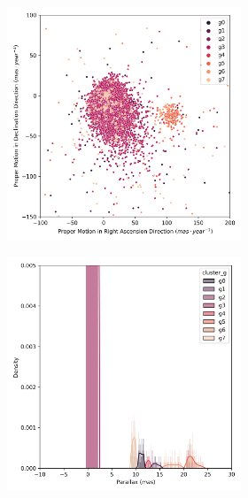 \documentclass[11pt, a4paper, english]{book}
\begin{document}
\begin{figure}[H]
\begin{subfigure}{0.9\textwidth}
\begin{subfigure}[t]{0.30\textwidth}
    \end{subfigure}
  \end{subfigure}
  \caption{Melotte 25 DEC characterization. Identified as cluster \emph{g5}.}
  \label{fig:result_melotte_25_dec}
  \centering
  \begin{subfigure}{0.9\textwidth}
    \centering
    \begin{subfigure}[t]{0.30\textwidth}
      \centering
      \includegraphics[width=\textwidth]{../figures/melotte_25/dec_pm_filtered_melotte_25.png}
    \end{subfigure}
    \hfill
    \begin{subfigure}[t]{0.30\textwidth}
      \centering
      \includegraphics[width=\textwidth]{../figures/melotte_25/dec_parallax_filtered_melotte_25.png}

\end{subfigure}
\end{subfigure}
\end{figure}
\end{document}
